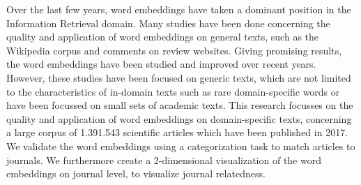 \documentclass[../../Thesis.tex]{subfiles}
\begin{document}
Over the last few years, word embeddings have taken a dominant position in the Information Retrieval domain. Many studies have been done concerning the quality and application of word embeddings on general texts, such as the Wikipedia corpus and comments on review websites. Giving promising results, the word embeddings have been studied and improved over recent years. However, these studies have been focused on generic texts, which are not limited to the characteristics of in-domain texts such as rare domain-specific words or have been focussed on small sets of academic texts. This research focusses on the quality and application of word embeddings on domain-specific texts, concerning a large corpus of 1.391.543 scientific articles which have been published in 2017. We validate the word embeddings using a categorization task to match articles to journals. We furthermore create a 2-dimensional visualization of the word embeddings on journal level, to visualize journal relatedness.
\end{document}
